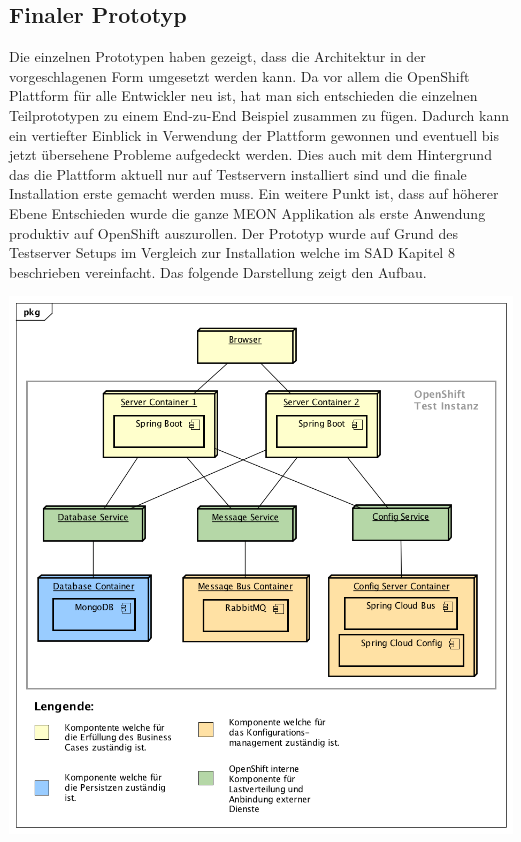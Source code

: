 \subsection{Finaler Prototyp}

Die einzelnen Prototypen haben gezeigt, dass die Architektur in der vorgeschlagenen Form umgesetzt werden kann. Da vor allem die OpenShift Plattform für alle Entwickler neu ist, hat man sich entschieden die einzelnen Teilprototypen zu einem End-zu-End Beispiel zusammen zu fügen. Dadurch kann ein vertiefter Einblick in Verwendung der Plattform gewonnen und eventuell bis jetzt übersehene Probleme aufgedeckt werden. Dies auch mit dem Hintergrund das die Plattform aktuell nur auf Testservern installiert sind und die finale Installation erste gemacht werden muss. Ein weitere Punkt ist, dass auf höherer Ebene Entschieden wurde die ganze MEON Applikation als erste Anwendung produktiv auf OpenShift auszurollen.\newline\newline
Der Prototyp wurde auf Grund des Testserver Setups im Vergleich zur Installation welche im SAD Kapitel 8 beschrieben vereinfacht. Das folgende Darstellung zeigt den Aufbau.

\begin{center}
	\includegraphics[scale=0.60]{PrototypDeployment.png}
\end{center}

